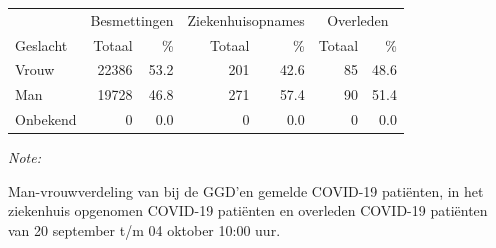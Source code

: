 \documentclass[
  english,
  man,floatsintext]{apa6}
\begin{document}
\begin{table}[H]
\centering\begingroup\fontsize{11}{13}\selectfont

\begin{threeparttable}
\begin{tabular}{lrrrrrr}
\toprule
\multicolumn{1}{c}{ } & \multicolumn{2}{c}{Besmettingen} & \multicolumn{2}{c}{Ziekenhuisopnames} & \multicolumn{2}{c}{Overleden} \\
\cmidrule(l{3pt}r{3pt}){2-3} \cmidrule(l{3pt}r{3pt}){4-5} \cmidrule(l{3pt}r{3pt}){6-7}
Geslacht & Totaal & \% & Totaal & \% & Totaal & \%\\
\midrule
Vrouw & 22386 & 53.2 & 201 & 42.6 & 85 & 48.6\\
Man & 19728 & 46.8 & 271 & 57.4 & 90 & 51.4\\
Onbekend & 0 & 0.0 & 0 & 0.0 & 0 & 0.0\\
\bottomrule
\end{tabular}
\begin{tablenotes}
\item \textit{Note: } 
\item Man-vrouwverdeling van bij de GGD’en gemelde COVID-19 patiënten, in het ziekenhuis opgenomen COVID-19 patiënten en overleden COVID-19 patiënten van 20 september t/m 04 oktober 10:00 uur.
\end{tablenotes}
\end{threeparttable}
\endgroup{}
\end{table}
\newpage
\end{document}
